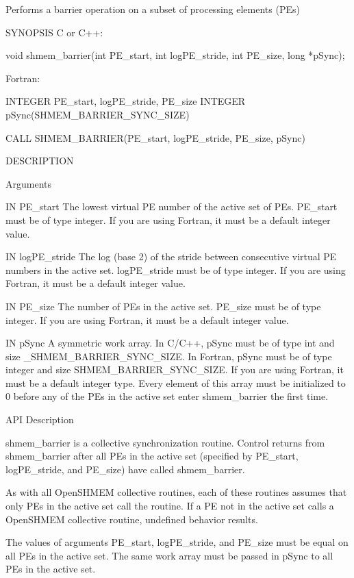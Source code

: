 Performs a barrier operation on a subset of processing
       elements (PEs)

SYNOPSIS
       C or C++:

	  void shmem_barrier(int PE_start, int logPE_stride, int PE_size, long
	  *pSync);

       Fortran:

	  INTEGER PE_start, logPE_stride, PE_size
	  INTEGER pSync(SHMEM_BARRIER_SYNC_SIZE)

	  CALL SHMEM_BARRIER(PE_start, logPE_stride, PE_size, pSync)

DESCRIPTION

Arguments

 	IN      PE_start	   The lowest virtual PE number of  the	 active	 set  of  PEs.
				   PE_start  must  be  of  type	 integer.   If	you  are using
		   		   Fortran, it must be a default integer value.

       IN	logPE_stride       The log (base 2) of the stride between consecutive  virtual
			   	   PE numbers in the active set.  logPE_stride must be of type
		   		   integer.  If you are using Fortran, it must	be  a  default
		   		   integer value.

	IN       PE_size	   The	number	of  PEs in the active set.  PE_size must be of
				   type integer.  If you are  using  Fortran,  it  must	 be  a
		  		   default integer value.

	IN       pSync		   A  symmetric	 work  array.  In C/C++, pSync must be of type
				   int and size _SHMEM_BARRIER_SYNC_SIZE.  In  Fortran,	 pSync
				   must	 be  of type integer and size SHMEM_BARRIER_SYNC_SIZE.
		  		   If you are using Fortran, it	 must  be  a  default  integer
		  		   type.  Every element of this array must be initialized to 0
		  		   before any of the PEs in the active set enter shmem_barrier
		  		   the first time.
   

API Description

       shmem_barrier is a collective synchronization routine.  Control returns
       from shmem_barrier after all  PEs  in  the  active  set	(specified  by
       PE_start, logPE_stride, and PE_size) have called shmem_barrier.

       As  with	 all OpenSHMEM collective routines, each of these routines assumes
       that only PEs in the active set call the routine.  If a PE not  in  the
       active  set  calls  a  OpenSHMEM  collective	 routine,  undefined  behavior
       results.

       The  values  of	arguments  PE_start, logPE_stride, and PE_size must be
       equal on all PEs in the active set.  The same work array must be passed
       in pSync to all PEs in the active set.


